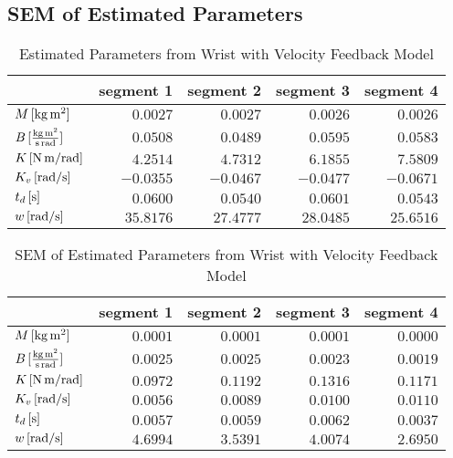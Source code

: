 \documentclass[11pt,a4paper]{article}
\begin{document}
\subsection{SEM of Estimated Parameters}
\begin{table}
    \centering
    \begin{tabular}{|l|r|r|r|r|}
        \hline
        \nonumber & segment 1 & segment 2 & segment 3 & segment 4 \\
        \hline
        $\unit[M]{[kg\,m^2]}$ & $0.0027$ & $0.0027$ & $0.0026$ & $0.0026$ \\
        $\unit[B]{[\frac{kg\,m^2}{s\,rad}]}$ & $0.0508$ & $0.0489$ &
            $0.0595$ & $0.0583$ \\
        $\unit[K]{[N\,m/rad]}$ & $4.2514$ & $4.7312$ & $6.1855$ & $7.5809$ \\
        $\unit[K_v]{[rad/s]}$ & $-0.0355$ & $-0.0467$ &
            $-0.0477$ & $-0.0671$ \\
        $\unit[t_d]{[s]}$ & $0.0600$ & $0.0540$ & $0.0601$ & $0.0543$ \\
        $\unit[w]{[rad/s]}$ & $35.8176$ & $27.4777$ & $28.0485$ & $25.6516$ \\
        \hline
    \end{tabular}
    \caption{Estimated Parameters from Wrist with Velocity Feedback Model}
    \label{tab:segparam}
\end{table}

\begin{table}
    \centering
    \begin{tabular}{|l|r|r|r|r|}
        \hline
        \nonumber & segment 1 & segment 2 & segment 3 & segment 4 \\
        \hline
        $\unit[M]{[kg\,m^2]}$ & $0.0001$ & $0.0001$ & $0.0001$ & $0.0000$ \\
        $\unit[B]{[\frac{kg\,m^2}{s\,rad}]}$ & $0.0025$ & $0.0025$ &
            $0.0023$ & $0.0019$ \\
        $\unit[K]{[N\,m/rad]}$ & $0.0972$ & $0.1192$ & $0.1316$ & $0.1171$ \\
        $\unit[K_v]{[rad/s]}$ & $0.0056$ & $0.0089$ & $0.0100$ & $0.0110$ \\
        $\unit[t_d]{[s]}$ & $0.0057$ & $0.0059$ & $0.0062$ & $0.0037$ \\
        $\unit[w]{[rad/s]}$ & $4.6994$ & $3.5391$ & $4.0074$ & $2.6950$ \\
        \hline
    \end{tabular}
    \caption{SEM of Estimated Parameters from Wrist with Velocity Feedback
        Model}
    \label{tab:segsem}
\end{table}
\end{document}
